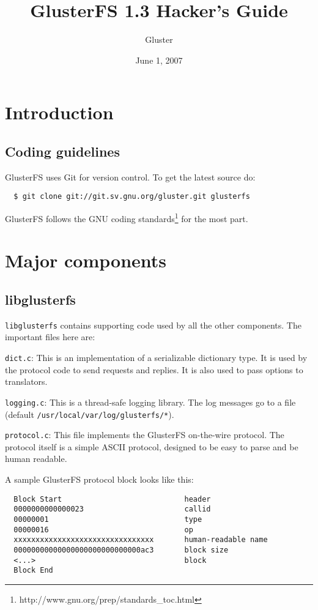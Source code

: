 \documentclass{book}[12pt]
\begin{document}

\author{Gluster}
\title{GlusterFS 1.3 Hacker's Guide}
\date{June 1, 2007}

\maketitle
\frontmatter
\tableofcontents

\mainmatter
\chapter{Introduction}

\section{Coding guidelines}
GlusterFS uses Git for version control. To get the latest source do:
\begin{verbatim}
  $ git clone git://git.sv.gnu.org/gluster.git glusterfs
\end{verbatim}
\noindent
GlusterFS follows the GNU coding
standards\footnote{http://www.gnu.org/prep/standards\_toc.html} for the
most part.

\chapter{Major components}
\section{libglusterfs}
\texttt{libglusterfs} contains supporting code used by all the other components. 
The important files here are:

\texttt{dict.c}: This is an implementation of a serializable dictionary type. It is
used by the protocol code to send requests and replies. It is also used to pass options
to translators.

\texttt{logging.c}: This is a thread-safe logging library. The log messages go to a
file (default \texttt{/usr/local/var/log/glusterfs/*}).

\texttt{protocol.c}: This file implements the GlusterFS on-the-wire
protocol. The protocol itself is a simple ASCII protocol, designed to
be easy to parse and be human readable.

A sample GlusterFS protocol block looks like this:
\begin{verbatim}
  Block Start                            header
  0000000000000023                       callid
  00000001                               type
  00000016                               op
  xxxxxxxxxxxxxxxxxxxxxxxxxxxxxxxx       human-readable name
  00000000000000000000000000000ac3       block size
  <...>                                  block
  Block End
\end{verbatim}
\end{document}
